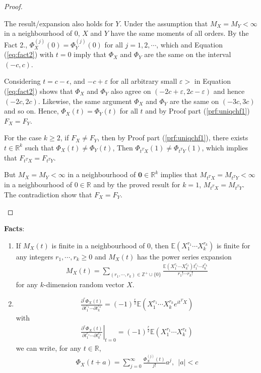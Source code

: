 \begin{proof}
\begin{enumerate}
        The result/expansion also holds for $Y$. Under the assumption that $M_X=M_Y<\infty$ in a neighbourhood of 0,
        $X$ and $Y$ have the same moments of all orders. 
        By the Fact 2., 
        $\Phi^{(j)}_X(0)=\Phi_Y^{(j)}(0)$ for all $j=1,2,\cdots$, 
        which and Equation (\ref{eq:fact2}) with $t=0$ imply that $\Phi_X$ and $\Phi_Y$ are the same on the interval $(-c,c)$.
        
        Considering $t=c-\epsilon$, and $-c+\varepsilon$ for all arbitrary small $\varepsilon>$ in Equation (\ref{eq:fact2})
        shows that $\Phi_X$ and $\Phi_Y$ also agree on $(-2c+\varepsilon, 2c-\varepsilon)$ and hence $(-2c,2c)$.
        Likewise, the same argument $\Phi_X$ and $\Phi_Y$ are the same on $(-3c,3c)$ and so on.
        Hence, $\Phi_X(t)=\Phi_Y(t)$ for all $t$ and by Proof part (\ref{prf:uniqchf1}) $F_X=F_Y$.
        
        For the case $k\geq 2$, if $F_X\neq F_Y$, then by Proof part (\ref{prf:uniqchf1}),
        there exists $t\in\mathbb{R}^k$ such that $\Phi_X(t)\neq\Phi_Y(t)$, Then $\Phi_{t^TX}(1)\neq\Phi_{t^TY}(1)$,
        which implies that $F_{t^TX}=F_{t^TY}$.
        
        But $M_X=M_Y<\infty$ in a neighbourhood of $\boldsymbol{0}\in\mathbb{R}^k$ implies that $M_{t^TX}=M_{t^TY}<\infty$
        in a neighbourhood of $0\in\mathbb{R}$ and by the proved result for $k=1$, $M_{t^TX}=M_{t^TY}$. The contradiction show that $F_X=F_Y$.
    \end{enumerate}
\end{proof}
$~$\\
\textbf{Facts}:
\begin{enumerate}
    \item If $M_X(t)$ is finite in a neighbourhood of 0, 
    then $\mathbb{E}(X_1^{r_1} \cdots X_k^{r_k})$ is finite for any integers $r_1,\cdots,r_k\geq 0$ and 
    $M_X(t)$ has the power series expansion
    \begin{gather}
        M_X(t)=\sum_{(r_1,\cdots,r_k)\in\mathbb{Z}^+\cup{\{0\}}}
        \frac{\mathbb{E}(X_1^{r_1} \cdots X_k^{r_k})t_1^{r_1} \cdots t_k^{r_k}}{r_1!\cdots r_k!}
    \end{gather}
    for any $k$-dimension random vector $X$.
    \item \begin{gather}
        \frac{\partial^r\Phi_X(t)}{\partial{t_1^{r_1}}\cdots\partial{t_k^{r_k}}}
        =(-1)^\frac{r}{2}\mathbb{E}(X_1^{r_1} \cdots X_k^{r_k}e^{it^TX})
    \end{gather}
    with 
    \begin{gather}
        \left.\frac{\partial^r\Phi_X(t)}{\partial{t_1^{r_1}}\cdots\partial{t_k^{r_k}}}\right|_{t=0}
        =(-1)^\frac{r}{2}\mathbb{E}(X_1^{r_1} \cdots X_k^{r_k})
    \end{gather}
    we can write, for any $t\in\mathbb{R}$, 
    \begin{gather}
        \Phi_X(t+a)=\sum_{j=0}^\infty\frac{\Phi_X^{(j)}(t)}{j!}a^j, ~~|a|<c\label{eq:fact2}
    \end{gather}
\end{enumerate}

